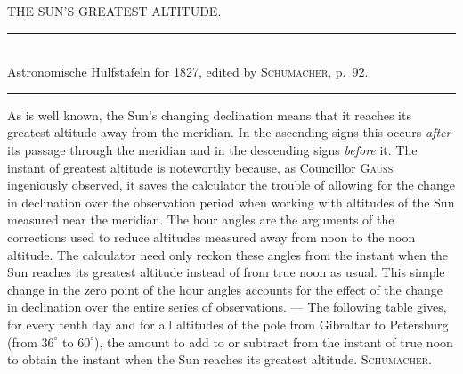 \clearpage
{}
\hypertarget{native-465-sunheight}{}
\begin{center}{\large THE SUN’S GREATEST ALTITUDE.}\end{center}

\begin{center}
\rule{0.55\linewidth}{0.4pt}\\[2pt]
Astronomische Hülfstafeln for 1827, edited by \textsc{Schumacher}, p.~92.\\[2pt]
\rule{0.55\linewidth}{0.4pt}
\end{center}

As is well known, the Sun’s changing declination means that it reaches its greatest altitude away from the meridian. In the ascending signs this occurs \emph{after} its passage through the meridian and in the descending signs \emph{before} it. The instant of greatest altitude is noteworthy because, as Councillor \textsc{Gauss} ingeniously observed, it saves the calculator the trouble of allowing for the change in declination over the observation period when working with altitudes of
the Sun measured near the meridian. The hour angles are the arguments of the corrections used to reduce altitudes measured away from noon to the noon altitude. The calculator need only reckon these angles from the instant when the Sun reaches its greatest altitude instead of from true noon as usual. This simple change in the zero point of the hour angles accounts for the effect of the change in declination over the entire series of observations. --- The following table gives, for every tenth day and for all altitudes of the pole from Gibraltar to Petersburg (from $36^\circ$ to $60^\circ$), the amount to add to or subtract from the instant of true noon to obtain the instant when the Sun reaches its greatest altitude. \textsc{Schumacher.}
